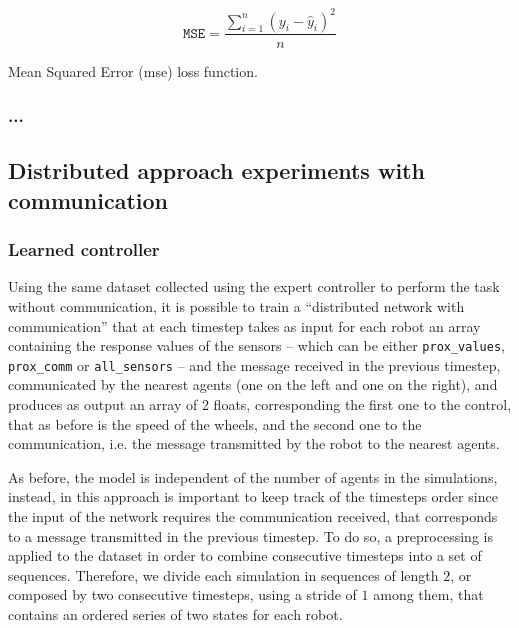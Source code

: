 \begin{Equation}[H]
	\centering
	\begin{equation}
	\mathtt{MSE} = \frac{\sum_{i=1}^n (y_i-\hat y_i)^2}{n}
	\end{equation}
	\caption{Mean Squared Error (\gls{mse}) loss function.}
	\label{eq:mse}
\end{Equation}
	
\subsubsection{...}
\label{subsubsec:....}


\subsection{Distributed approach experiments with communication}
\label{subsec:ex1comm}


\subsubsection{Learned controller}
\label{subsubsec:learnedcomm}

Using the same dataset collected using the expert controller to perform the task 
without communication, it is possible to train a ``distributed network with 
communication'' that at each timestep takes as input for each robot an array 
containing the response values of the sensors – which can be either 
\texttt{prox\_values}, \texttt{prox\_comm} or \texttt{all\_sensors} – and the 
message received in the previous timestep, communicated by the nearest agents 
(one on the left and one on the right), and produces as output an array of 2 
floats, corresponding the first one to the control, that as before is the speed of the 
wheels, and the second one to the communication, i.e. the message transmitted 
by the robot to the nearest agents.

As before, the model is independent of the number of agents in the simulations, 
instead, in this approach is important to keep track of the timesteps order since 
the input of the network requires the communication received, that corresponds 
to a message transmitted in the previous timestep. 
To do so, a preprocessing is applied to the dataset in order to combine 
consecutive timesteps into a set of sequences. Therefore, we divide each 
simulation in sequences of length $2$, or composed by two consecutive 
timesteps, using a stride of $1$ among them, that contains an ordered series of 
two states for each robot.   

